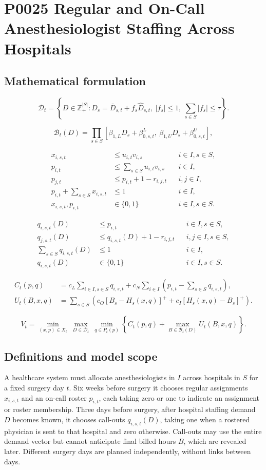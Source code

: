 \documentclass[10pt]{article}
\begin{document}
\section*{P0025 Regular and On-Call Anesthesiologist Staffing Across Hospitals}
\subsection*{Mathematical formulation}
\[
\mathcal D_t=\left\{D\in\mathbb Z_+^{|S|}:D_s=\bar D_{s,t}+f_s\widehat D_{s,t},\ |f_s|\leq1,\ \sum_{s\in S}|f_s|\leq\tau\right\}.
\]

\[
\mathcal B_t(D)=\prod_{s\in S}[\beta_{1,L}D_s+\beta_{0,s,t}^{L},\ \beta_{1,U}D_s+\beta_{0,s,t}^{U}],
\]

\begin{align}
x_{i,s,t}&\leq u_{i,t}v_{i,s}&&i\in I,s\in S,\\
p_{i,t}&\leq\sum_{s\in S}u_{i,t}v_{i,s}&&i\in I,\\
p_{j,t}&\leq p_{i,t}+1-r_{i,j,t}&&i,j\in I,\\
p_{i,t}+\sum_{s\in S}x_{i,s,t}&\leq1&&i\in I,\\
x_{i,s,t},p_{i,t}&\in\{0,1\}&&i\in I,s\in S.
\end{align}

\begin{align}
q_{i,s,t}(D)&\leq p_{i,t}&&i\in I,s\in S,\\
q_{j,s,t}(D)&\leq q_{i,s,t}(D)+1-r_{i,j,t}&&i,j\in I,s\in S,\\
\sum_{s\in S}q_{i,s,t}(D)&\leq1&&i\in I,\\
q_{i,s,t}(D)&\in\{0,1\}&&i\in I,s\in S.
\end{align}

\begin{align*}
C_t(p,q)&=c_L\sum_{i\in I,s\in S}q_{i,s,t}+c_N\sum_{i\in I}\left(p_{i,t}-\sum_{s\in S}q_{i,s,t}\right),\\
U_t(B,x,q)&=\sum_{s\in S}\left(c_O[B_s-H_s(x,q)]^++c_I[H_s(x,q)-B_s]^+\right).
\end{align*}

\begin{equation}
\boxed{V_t=\min_{(x,p)\in X_t}\ \max_{D\in\mathcal D_t}\ \min_{q\in P_t(p)}\left\{C_t(p,q)+\max_{B\in\mathcal B_t(D)}U_t(B,x,q)\right\}.}
\end{equation}

\subsection*{Definitions and model scope}
A healthcare system must allocate anesthesiologists in $I$ across hospitals in $S$ for a fixed surgery day $t$. Six weeks before surgery it chooses regular assignments $x_{i,s,t}$ and an on-call roster $p_{i,t}$, each taking zero or one to indicate an assignment or roster membership. Three days before surgery, after hospital staffing demand $D$ becomes known, it chooses call-outs $q_{i,s,t}(D)$, taking one when a rostered physician is sent to that hospital and zero otherwise. Call-outs may use the entire demand vector but cannot anticipate final billed hours $B$, which are revealed later. Different surgery days are planned independently, without links between days.
\end{document}
